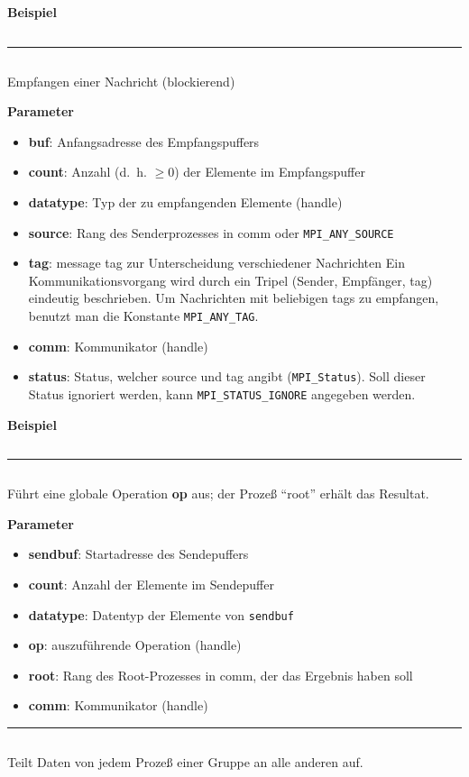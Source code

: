 \textbf{Beispiel}
\inputminted[numbersep=5pt, tabsize=4]{c}{scripts/mpi/mpi-send-example.c}
\goodbreak
\rule{\textwidth}{0.4pt}%
\inputminted[numbersep=5pt, tabsize=4]{c}{scripts/mpi/mpi-receive.c}
Empfangen einer Nachricht (blockierend) 

\textbf{Parameter}
\begin{itemize}
    \item \textbf{buf}: Anfangsadresse des Empfangspuffers
    \item \textbf{count}: Anzahl (d.~h. $\geq 0$) der Elemente im Empfangspuffer
    \item \textbf{datatype}: Typ der zu empfangenden Elemente (handle)
    \item \textbf{source}: Rang des Senderprozesses in comm oder \texttt{MPI\_ANY\_SOURCE}
    \item \textbf{tag}: message tag zur Unterscheidung verschiedener Nachrichten
                  Ein Kommunikationsvorgang wird durch ein Tripel (Sender, Empfänger, tag) eindeutig beschrieben. Um Nachrichten mit beliebigen tags zu empfangen, benutzt man die Konstante \texttt{MPI\_ANY\_TAG}.
    \item \textbf{comm}: Kommunikator (handle) 
    \item \textbf{status}: Status, welcher source und tag angibt (\texttt{MPI\_Status}).
          Soll dieser Status ignoriert werden, kann \texttt{MPI\_STATUS\_IGNORE} angegeben werden.
\end{itemize}

\textbf{Beispiel}
\inputminted[numbersep=5pt, tabsize=4]{c}{scripts/mpi/mpi-receive-example.c}
\goodbreak
\rule{\textwidth}{0.4pt}%
\inputminted[numbersep=5pt, tabsize=4]{c}{scripts/mpi/mpi-reduce.c}
Führt eine globale Operation \textbf{op} aus; der Prozeß \enquote{root} erhält das Resultat.

\textbf{Parameter}
\begin{itemize}
    \item \textbf{sendbuf}: Startadresse des Sendepuffers
    \item \textbf{count}: Anzahl der Elemente im Sendepuffer
    \item \textbf{datatype}: Datentyp der Elemente von \texttt{sendbuf}
    \item \textbf{op}: auszuführende Operation (handle)
    \item \textbf{root}: Rang des Root-Prozesses in comm, der das Ergebnis haben soll
    \item \textbf{comm}: Kommunikator (handle)
\end{itemize}
\goodbreak
\rule{\textwidth}{0.4pt}%
\inputminted[numbersep=5pt, tabsize=4]{c}{scripts/mpi/mpi-alltoall.c}
Teilt Daten von jedem Prozeß einer Gruppe an alle anderen auf.

